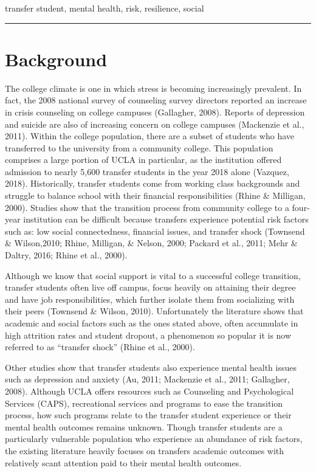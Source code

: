 \documentclass[]{book}
\begin{document}
transfer student, mental health, risk, resilience, social

\begin{center}\rule{0.5\linewidth}{0.5pt}\end{center}

\hypertarget{background}{%
\section{Background}\label{background}}

The college climate is one in which stress is becoming increasingly prevalent. In fact, the 2008 national survey of counseling survey directors reported an increase in crisis counseling on college campuses (Gallagher, 2008). Reports of depression and suicide are also of increasing concern on college campuses (Mackenzie et al., 2011). Within the college population, there are a subset of students who have transferred to the university from a community college. This population comprises a large portion of UCLA in particular, as the institution offered admission to nearly 5,600 transfer students in the year 2018 alone (Vazquez, 2018). Historically, transfer students come from working class backgrounds and struggle to balance school with their financial responsibilities (Rhine \& Milligan, 2000). Studies show that the transition process from community college to a four-year institution can be difficult because transfers experience potential risk factors such as: low social connectedness, financial issues, and transfer shock (Townsend \& Wilson,2010; Rhine, Milligan, \& Nelson, 2000; Packard et al., 2011; Mehr \& Daltry, 2016; Rhine et al., 2000).

Although we know that social support is vital to a successful college transition, transfer students often live off campus, focus heavily on attaining their degree and have job responsibilities, which further isolate them from socializing with their peers (Townsend \& Wilson, 2010). Unfortunately the literature shows that academic and social factors such as the ones stated above, often accumulate in high attrition rates and student dropout, a phenomenon so popular it is now referred to as ``transfer shock'' (Rhine et al., 2000).

Other studies show that transfer students also experience mental health issues such as depression and anxiety (Au, 2011; Mackenzie et al., 2011; Gallagher, 2008). Although UCLA offers resources such as Counseling and Psychological Services (CAPS), recreational services and programs to ease the transition process, how such programs relate to the transfer student experience or their mental health outcomes remains unknown. Though transfer students are a particularly vulnerable population who experience an abundance of risk factors, the existing literature heavily focuses on transfers academic outcomes with relatively scant attention paid to their mental health outcomes.
\end{document}
